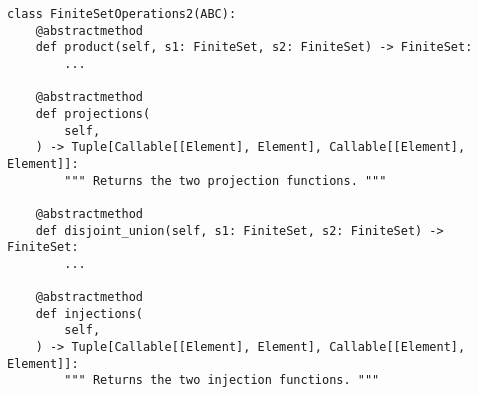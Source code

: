 \par\begin{minipage}{75ex}
\begin{verbatim}
class FiniteSetOperations2(ABC):
    @abstractmethod
    def product(self, s1: FiniteSet, s2: FiniteSet) -> FiniteSet:
        ...

    @abstractmethod
    def projections(
        self,
    ) -> Tuple[Callable[[Element], Element], Callable[[Element], Element]]:
        """ Returns the two projection functions. """

    @abstractmethod
    def disjoint_union(self, s1: FiniteSet, s2: FiniteSet) -> FiniteSet:
        ...

    @abstractmethod
    def injections(
        self,
    ) -> Tuple[Callable[[Element], Element], Callable[[Element], Element]]:
        """ Returns the two injection functions. """
\end{verbatim}
\end{minipage}\par